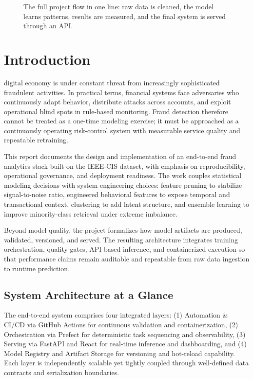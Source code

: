 \documentclass[10pt,journal,compsoc,twocolumn]{IEEEtran}
\begin{document}
\begin{figure}[H]
 \centering
 \caption{The full project flow in one line: raw data is cleaned, the model learns patterns, results are measured, and the final system is served through an API.}
\end{figure}

\section{Introduction}
 digital economy is under constant threat from increasingly sophisticated fraudulent activities. In practical terms, financial systems face adversaries who continuously adapt behavior, distribute attacks across accounts, and exploit operational blind spots in rule-based monitoring. Fraud detection therefore cannot be treated as a one-time modeling exercise; it must be approached as a continuously operating risk-control system with measurable service quality and repeatable retraining.

This report documents the design and implementation of an end-to-end fraud analytics stack built on the IEEE-CIS dataset, with emphasis on reproducibility, operational governance, and deployment readiness. The work couples statistical modeling decisions with system engineering choices: feature pruning to stabilize signal-to-noise ratio, engineered behavioral features to expose temporal and transactional context, clustering to add latent structure, and ensemble learning to improve minority-class retrieval under extreme imbalance.

Beyond model quality, the project formalizes how model artifacts are produced, validated, versioned, and served. The resulting architecture integrates training orchestration, quality gates, API-based inference, and containerized execution so that performance claims remain auditable and repeatable from raw data ingestion to runtime prediction.

\subsection{System Architecture at a Glance}
The end-to-end system comprises four integrated layers: (1) Automation \& CI/CD via GitHub Actions for continuous validation and containerization, (2) Orchestration via Prefect for deterministic task sequencing and observability, (3) Serving via FastAPI and React for real-time inference and dashboarding, and (4) Model Registry and Artifact Storage for versioning and hot-reload capability. Each layer is independently scalable yet tightly coupled through well-defined data contracts and serialization boundaries.
\end{document}
